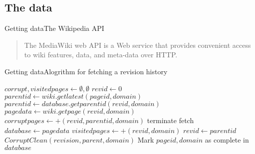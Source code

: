 \documentclass[t]{beamer}
\begin{document}
  \subsection{The data}
  \begin{frame}{Getting data}{The Wikipedia API}
    
    \begin{quote}
      The MediaWiki web API is a Web service that provides convenient
      access to wiki features, data, and meta-data over HTTP.
    \end{quote}


 
  \end{frame}
  
  \begin{frame}[fragile]{Getting data}{Alogrithm for fetching a revision history}    
        \tiny  
      \begin{algorithmic}
        \tiny
          \State $corrupt,visitedpages \gets \emptyset , \emptyset$
          \State $revid \gets 0$
          \State $parentid \gets wiki.getlatest(pageid, domain)$
          \label{datal1} 
          \State $parentid \gets database.getparentid(revid, domain)$
          \Else
          \State $pagedata \gets wiki.getpage(revid, domain)$
          \EndIf
          \label{datal3}
          \State $corruptpages \gets + (revid, parentid, domain)$
          \Else
          \State terminate fetch\label{datal4}
          \EndIf
          \Else
          \State $database \gets page data$
          \EndIf
          \State $visitedpages \gets + (revid, domain)$
          \State $revid \gets parentid$\label{datal2}
          \EndWhile
          \State $CorruptClean(revision, parent, domain)$
          \EndFor
          \State Mark $pageid, domain$ as complete in $database$
          \EndProcedure
        \end{algorithmic}
\end{frame}
\end{document}
